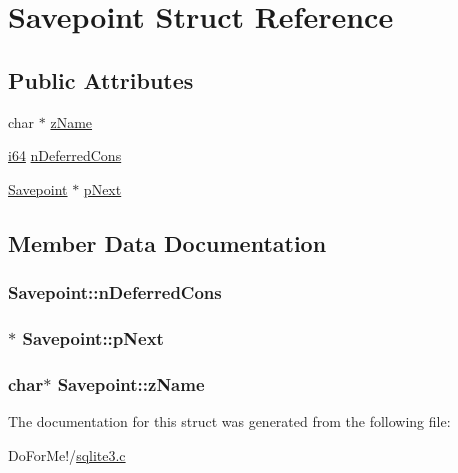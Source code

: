 \hypertarget{struct_savepoint}{\section{Savepoint Struct Reference}
\label{struct_savepoint}
}
\subsection*{Public Attributes}
\begin{DoxyCompactItemize}
\item 
char $\ast$ \hyperlink{struct_savepoint_a0ba08ea77fcfd93099288375e2e9b1ec}{z\-Name}
\item 
\hyperlink{sqlite3_8c_a2a0f0f4ae7001eb54351f77ea1cdbcfd}{i64} \hyperlink{struct_savepoint_ae00dd8f725701d9e31da2edbb0b27435}{n\-Deferred\-Cons}
\item 
\hyperlink{struct_savepoint}{Savepoint} $\ast$ \hyperlink{struct_savepoint_a8d785c3c0eeb6f0c62ea5391892c78cb}{p\-Next}
\end{DoxyCompactItemize}


\subsection{Member Data Documentation}
\hypertarget{struct_savepoint_ae00dd8f725701d9e31da2edbb0b27435}{
\subsubsection[{n\-Deferred\-Cons}]{ Savepoint\-::n\-Deferred\-Cons}}\label{struct_savepoint_ae00dd8f725701d9e31da2edbb0b27435}
\hypertarget{struct_savepoint_a8d785c3c0eeb6f0c62ea5391892c78cb}{
\subsubsection[{p\-Next}]{$\ast$ Savepoint\-::p\-Next}}\label{struct_savepoint_a8d785c3c0eeb6f0c62ea5391892c78cb}
\hypertarget{struct_savepoint_a0ba08ea77fcfd93099288375e2e9b1ec}{
\subsubsection[{z\-Name}]{\setlength{\rightskip}{0pt plus 5cm}char$\ast$ Savepoint\-::z\-Name}}\label{struct_savepoint_a0ba08ea77fcfd93099288375e2e9b1ec}


The documentation for this struct was generated from the following file\-:\begin{DoxyCompactItemize}
\item 
Do\-For\-Me!/\hyperlink{sqlite3_8c}{sqlite3.\-c}\end{DoxyCompactItemize}
